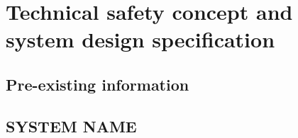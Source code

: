 \section{Technical safety concept and system design specification}
%
% 

\subsection{Pre-existing information}
%

\subsection{SYSTEM NAME}
%
%
%
